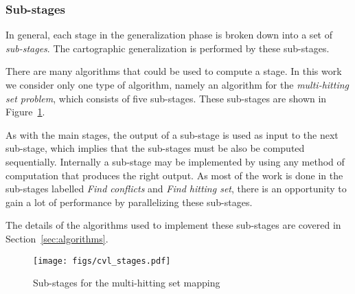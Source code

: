 \subsubsection{Sub-stages}
In general, each stage in the generalization phase is broken down into a set of \emph{sub-stages}. The cartographic generalization is performed by these sub-stages. 

There are many algorithms that could be used to compute a stage. In this work we consider only one type of algorithm, namely an algorithm for the \emph{multi-hitting set problem}, which consists of five sub-stages. These sub-stages are shown in Figure~\ref{fig:stages}. 

As with the main stages, the output of a sub-stage is used as input to the next sub-stage, which implies that the sub-stages must be also be computed sequentially. Internally a sub-stage may be implemented by using any method of computation that produces the right output. As most of the work is done in the sub-stages labelled \emph{Find conflicts} and \emph{Find hitting set}, there is an opportunity to gain a lot of performance by parallelizing these sub-stages.

The details of the algorithms used to implement these sub-stages are covered in Section~\ref{sec:algorithms}. 

\begin{figure}[htbp]
\begin{center}
\texttt{[image: figs/cvl\_stages.pdf]}
\caption{Sub-stages for the multi-hitting set mapping}
\label{fig:stages}
\end{center}
\end{figure}

